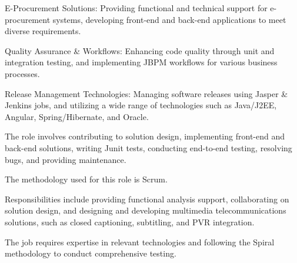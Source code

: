\documentclass[]{plushcv}
\begin{document}
\begin{minipage}[t]{0.70\textwidth}
\begin{tightemize}
\sectionsep
\item E-Procurement Solutions: Providing functional and technical support for e-procurement systems, developing front-end and back-end applications to meet diverse requirements.
\item Quality Assurance & Workflows: Enhancing code quality through unit and integration testing, and implementing JBPM workflows for various business processes.
\item Release Management Technologies: Managing software releases using Jasper & Jenkins jobs, and utilizing a wide range of technologies such as Java/J2EE, Angular, Spring/Hibernate, and Oracle.
\end{tightemize}
\sectionsep
{}
\begin{tightemize}
\sectionsep
\item The role involves contributing to solution design, implementing front-end and back-end solutions, writing Junit tests, conducting end-to-end testing, resolving bugs, and providing maintenance.
\item The methodology used for this role is Scrum.
\end{tightemize}
\sectionsep
{}
\begin{tightemize}
\sectionsep
\item Responsibilities include providing functional analysis support, collaborating on solution design, and designing and developing multimedia telecommunications solutions, such as closed captioning, subtitling, and PVR integration.
\item The job requires expertise in relevant technologies and following the Spiral methodology to conduct comprehensive testing.
\end{tightemize}
\sectionsep
{}



\end{minipage}
\end{document}
